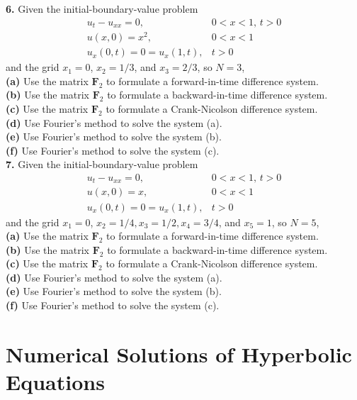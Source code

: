 \documentclass{amsbook}%
\theoremstyle{plain}
\numberwithin{equation}{section}
\begin{document}
		\noindent\textbf{6.} Given the initial-boundary-value problem
		\begin{align}
			u_t-u_{xx}=0, & 0<x<1,\, t>0\\
			u(x,0)=x^2, & 0<x<1\\
			u_x(0,t)=0=u_x(1,t), & t>0
		\end{align}
		and the grid $x_1=0$, $x_2=1/3$, and $x_3=2/3$, so $N=3$,\\
		\textbf{(a)} Use the matrix $\mathbf{F}_2$ to formulate a forward-in-time difference system.\\
		\textbf{(b)} Use the matrix $\mathbf{F}_2$ to formulate a backward-in-time difference system.\\
		\textbf{(c)} Use the matrix $\mathbf{F}_2$ to formulate a Crank-Nicolson difference system.\\
		\textbf{(d)} Use Fourier's method to solve the system (a).\\
		\textbf{(e)} Use Fourier's method to solve the system (b).\\
		\textbf{(f)} Use Fourier's method to solve the system (c).\\[12pt]		
		
		\noindent\textbf{7.} Given the initial-boundary-value problem
		\begin{align}
			u_t-u_{xx}=0, & 0<x<1,\, t>0\\
			u(x,0)=x, & 0<x<1\\
			u_x(0,t)=0=u_x(1,t), & t>0
		\end{align}
		and the grid $x_1=0$, $x_2=1/4, x_3=1/2, x_4=3/4$, and $x_5=1$, so $N=5$,\\
		\textbf{(a)} Use the matrix $\mathbf{F}_2$ to formulate a forward-in-time difference system.\\
		\textbf{(b)} Use the matrix $\mathbf{F}_2$ to formulate a backward-in-time difference system.\\
		\textbf{(c)} Use the matrix $\mathbf{F}_2$ to formulate a Crank-Nicolson difference system.\\
		\textbf{(d)} Use Fourier's method to solve the system (a).\\
		\textbf{(e)} Use Fourier's method to solve the system (b).\\
		\textbf{(f)} Use Fourier's method to solve the system (c).\\[12pt]		
		
\chapter{Numerical Solutions of Hyperbolic Equations}
\end{document}
